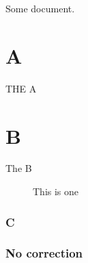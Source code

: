 \documentclass{article}
\begin{document}
Some document.

\chapter{A}\label{chap:A}
THE A

\chapter{B}\label{chap:B}
The B

\begin{figure}
\caption{This is one}\label{fig:some-figure}
\end{figure}

\subsection{C}\label{subsec:C}
\subsection{No correction}\label{no:correction}
\end{document}
